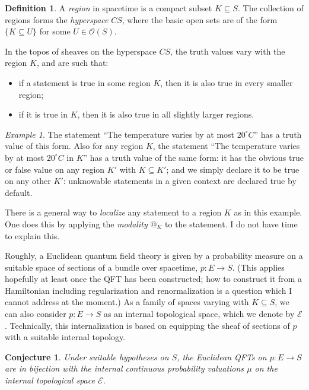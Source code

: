 \documentclass[11pt, oneside, article]{memoir}
\makeatletter
\theoremstyle{plain}
\newtheorem{conjecture}[theorem]{Conjecture}
\theoremstyle{definition}
\newtheorem{definition}[theorem]{Definition}
\theoremstyle{remark}
\newtheorem{example}[theorem]{Example}
\newcommand{\Open}[1]{\mathcal{O}(#1)}
\newcommand{\AtSymbol}{{@}}
\newcommand{\At}[2][]{\AtSymbol^{#1}_{#2}}
\makeatother
\begin{document}
\begin{definition}
A \emph{region} in spacetime is a compact subset $K \subseteq S$. The collection of regions forms the \emph{hyperspace} $CS$, where the basic open sets are of the form $\{ K \subseteq U \}$ for some $U\in\Open{S}$.
\end{definition}

In the topos of sheaves on the hyperspace $CS$, the truth values vary with the region $K$, and are such that:
\begin{itemize}
\item if a statement is true in some region $K$, then it is also true in every smaller region; 
\item if it is true in $K$, then it is also true in all slightly larger regions.
\end{itemize}

\begin{example}
The statement ``The temperature varies by at most $20^\circ C$'' has a truth value of this form. Also for any region $K$, the statement ``The temperature varies by at most $20^\circ C$ in $K$'' has a truth value of the same form: it has the obvious true or false value on any region $K'$ with $K\subseteq K'$; and we simply declare it to be true on any other $K'$: unknowable statements in a given context are declared true by default.

There is a general way to \emph{localize} any statement to a region $K$ as in this example. One does this by applying the \emph{modality} $\At{K}$ to the statement. I do not have time to explain this.
\end{example}

Roughly, a Euclidean quantum field theory is given by a probability measure on a suitable space of sections of a bundle over spacetime, $p : E \to S$. (This applies hopefully at least once the QFT has been constructed; how to construct it from a Hamiltonian including regularization and renormalization is a question which I cannot address at the moment.) As a family of spaces varying with $K\subseteq S$, we can also consider $p : E \to S$ as an internal topological space, which we denote by $\mathcal{E}$. Technically, this internalization is based on equipping the sheaf of sections of $p$ with a suitable internal topology.

\begin{conjecture}
Under suitable hypotheses on $S$, the Euclidean QFTs on $p : E \to S$ are in bijection with the internal continuous probability valuations $\mu$ on the internal topological space $\mathcal{E}$.
\end{conjecture}
\end{document}
